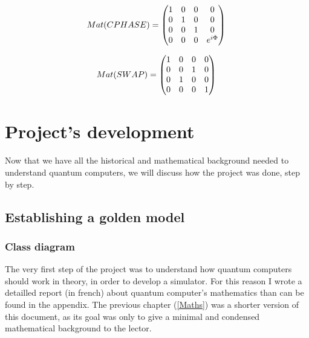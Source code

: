 \documentclass[a4paper,12pt]{report}
\newcommand{\para}[1]{\par{#1}\\}
\begin{document}
\vspace{1\baselineskip}

\begin{equation}
	 Mat(CPHASE) = \left( \begin{matrix} 1 & 0 & 0 & 0 \\ 0 & 1 & 0 & 0 \\ 0 & 0 & 1 & 0 \\ 0 & 0 & 0 & e^{i\Phi} \\ \end{matrix} \right ) \\
\end{equation}

\vspace{1\baselineskip}

\begin{equation}
	 Mat(SWAP) = \left( \begin{matrix} 1 & 0 & 0 & 0 \\ 0 & 0 & 1 & 0 \\ 0 & 1 & 0 & 0 \\ 0 & 0 & 0 & 1 \\ \end{matrix} \right ) \\
\end{equation}

%
%

\chapter{Project's development}

\para{
    Now that we have all the historical and mathematical background needed to understand quantum computers, we will discuss how the project was done, step by step.
}

    \section{Establishing a golden model}

        \subsection{Class diagram}

\para{
    The very first step of the project was to understand how quantum computers should work in theory, in order to develop a simulator. For this reason I wrote a detailled report (in french) about quantum computer's mathematics than can be found in the appendix. The previous chapter (\ref{Maths}) was a shorter version of this document, as its goal was only to give a minimal and condensed mathematical background to the lector.
}
\end{document}
